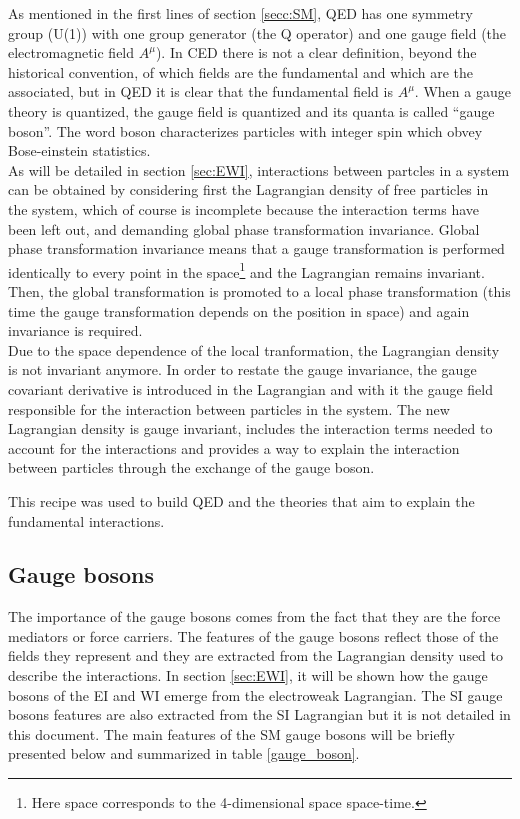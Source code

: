 \noindent As mentioned in the first lines of section \ref{secc:SM}, QED has one symmetry group (U(1)) with one group generator (the Q operator) and one gauge field (the electromagnetic field $A^\mu$). In CED there is not a clear definition, beyond the historical convention, of which fields are the fundamental and which are the associated, but in QED it is clear that the fundamental field is $A^\mu$. When a gauge theory is quantized, the gauge field is quantized and its quanta is called ``gauge boson''. The word boson characterizes particles with integer spin which obvey Bose-einstein statistics.\\      

\noindent As will be detailed in section \ref{sec:EWI}, interactions between partcles in a system can be obtained by considering first the Lagrangian density of free particles in the system, which of course is incomplete because the interaction terms have been left out, and demanding global phase transformation invariance. Global phase transformation invariance means that a gauge transformation is performed identically to every point in the space\footnote{Here space corresponds to the 4-dimensional space \ie space-time.} and the Lagrangian remains invariant. Then, the global transformation is promoted to a local phase transformation (this time the gauge transformation depends on the position in space) and again invariance is required.\\

\noindent Due to the space dependence of the local tranformation, the Lagrangian density is not invariant anymore. In order to restate the gauge invariance, the gauge covariant derivative is introduced in the Lagrangian and with it the gauge field responsible for the interaction between particles in the system. The new Lagrangian density is gauge invariant, includes the interaction terms needed to account for the interactions and provides a way to explain the interaction between particles through the exchange of the gauge boson.

\noindent This recipe was used to build QED and the theories that aim to explain the fundamental interactions.   

\subsection{Gauge bosons}\label{sec:gb}

The importance of the gauge bosons comes from the fact that they are the force mediators or force carriers. The features of the gauge bosons reflect those of the fields they represent and they are extracted from the Lagrangian density used to describe the interactions. In section \ref{sec:EWI}, it will be shown how the gauge bosons of the EI and WI emerge from the electroweak Lagrangian. The SI gauge bosons features are also extracted from the SI Lagrangian but it is not detailed in this document. The main features of the SM gauge bosons will be briefly presented below and summarized in table \ref{gauge_boson}.

